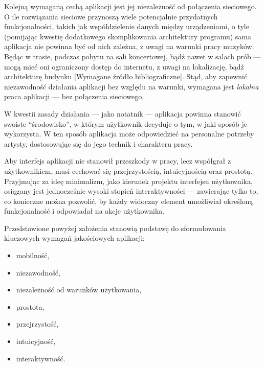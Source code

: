 Kolejną wymaganą cechą aplikacji jest jej niezależność od połączenia sieciowego.
O ile rozwiązania sieciowe przynoszą wiele potencjalnie przydatnych funkcjonalności,
takich jak współdzielenie danych między urządzeniami,
o tyle (pomijając kwestię dodatkowego skomplikowania architektury programu)
sama aplikacja nie powinna być od nich zależna, z uwagi na warunki pracy muzyków.
Będąc w trasie, podczas pobytu na sali koncertowej, bądź nawet w salach prób — mogą mieć oni ograniczony dostęp do internetu,
z uwagi na lokalizację, bądź architekturę budynku [Wymagane źródło bibliograficzne].
Stąd, aby zapewnić niezawodność działania aplikacji bez względu na warunki, wymagana jest \textit{lokalna} praca aplikacji —
bez połączenia sieciowego.

W kwestii zasady działania — jako notatnik — aplikacja powinna stanowić swoiste \enquote{środowisko},
w którym użytkownik decyduje o tym, w jaki sposób je wykorzysta.
W ten sposób aplikacja może odpowiedzieć na personalne potrzeby artysty, dostosowując się do jego technik i charakteru pracy.

Aby interfejs aplikacji nie stanowił przeszkody w pracy, lecz współgrał z użytkownikiem, musi cechować się przejrzystością,
intuicyjnością oraz prostotą.
Przyjmując za ideę minimalizm, jako kierunek projektu interfejsu użytkownika, osiągany jest jednocześnie wysoki stopień
interaktywności — zawierając tylko to, co konieczne można pozwolić, by każdy widoczny element umożliwiał określoną
funkcjonalność i odpowiadał na akcje użytkownika.

Przedstawione powyżej założenia stanowią podstawę do sformułowania kluczowych wymagań jakościowych aplikacji:
\begin{itemize}
	\item mobilność,
	\item niezawodność,
	\item niezależność od warunków użytkowania,
	\item prostota,
	\item przejrzystość,
	\item intuicyjność,
	\item interaktywność.
\end{itemize}

